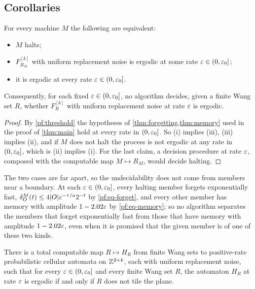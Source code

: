 \subsection{Corollaries}\label{pf:sec-cor}

\begin{corollary}\label{cor:rates}
For every machine $M$ the following are equivalent:
\begin{itemize}
\item[(i)] $M$ halts;
\item[(ii)] $F^{[k]}_{R_M}$ with uniform replacement noise is ergodic at some rate $\varepsilon\in(0,\varepsilon_0]$;
\item[(iii)] it is ergodic at every rate $\varepsilon\in(0,\varepsilon_0]$.
\end{itemize}
Consequently, for each fixed $\varepsilon\in(0,\varepsilon_0]$, no algorithm decides, given a finite Wang set $R$, whether $F^{[k]}_R$ with uniform replacement noise at rate $\varepsilon$ is ergodic.
\end{corollary}

\begin{proof}
By \cref{pf:threshold} the hypotheses of \cref{thm:forgetting,thm:memory} used in the proof of \cref{thm:main} hold at every rate in $(0,\varepsilon_0]$. So (i) implies (iii), (iii) implies (ii), and if $M$ does not halt the process is not ergodic at any rate in $(0,\varepsilon_0]$, which is (ii) implies (i). For the last claim, a decision procedure at rate $\varepsilon$, composed with the computable map $M\mapsto R_M$, would decide halting.
\end{proof}

The two cases are far apart, so the undecidability does not come from members near a boundary. At each $\varepsilon\in(0,\varepsilon_0]$, every halting member forgets exponentially fast, $\delta^M_O(t)\le4|O|\varepsilon^{-\tau/a}2^{-t}$ by \eqref{pf:eq-forget}, and every other member has memory with amplitude $1-2.02\varepsilon$ by \eqref{pf:eq-memory}; so no algorithm separates the members that forget exponentially fast from those that have memory with amplitude $1-2.02\varepsilon$, even when it is promised that the given member is of one of these two kinds.

\begin{corollary}\label{cor:tiling}
There is a total computable map $R\mapsto H_R$ from finite Wang sets to positive-rate probabilistic cellular automata on $\mathbb{Z}^{2+k}$, each with uniform replacement noise, such that for every $\varepsilon\in(0,\varepsilon_0]$ and every finite Wang set $R$, the automaton $H_R$ at rate $\varepsilon$ is ergodic if and only if $R$ does not tile the plane.
\end{corollary}

